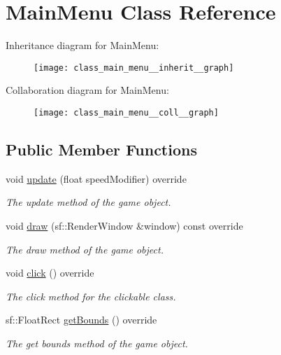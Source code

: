 \hypertarget{class_main_menu}{\section{Main\+Menu Class Reference}
\label{class_main_menu}
}


Inheritance diagram for Main\+Menu\+:\nopagebreak
\begin{figure}[H]
\begin{center}
\leavevmode
\texttt{[image: class\_main\_menu\_\_inherit\_\_graph]}
\end{center}
\end{figure}


Collaboration diagram for Main\+Menu\+:\nopagebreak
\begin{figure}[H]
\begin{center}
\leavevmode
\texttt{[image: class\_main\_menu\_\_coll\_\_graph]}
\end{center}
\end{figure}
\subsection*{Public Member Functions}
\begin{DoxyCompactItemize}
\item 
void \hyperlink{class_main_menu_a41b86746c468d18532123dfda01425de}{update} (float speed\+Modifier) override
\begin{DoxyCompactList}\small\item\em The update method of the game object. \end{DoxyCompactList}\item 
void \hyperlink{class_main_menu_a2956b42855e47b2e8e10412a26ef672b}{draw} (sf\+::\+Render\+Window \&window) const override
\begin{DoxyCompactList}\small\item\em The draw method of the game object. \end{DoxyCompactList}\item 
void \hyperlink{class_main_menu_ac97a553b913177aeabeb0bfcc4b54caa}{click} () override
\begin{DoxyCompactList}\small\item\em The click method for the clickable class. \end{DoxyCompactList}\item 
sf\+::\+Float\+Rect \hyperlink{class_main_menu_a6a52b7d7cb8e09360ebc3428aad67ed1}{get\+Bounds} () override
\begin{DoxyCompactList}\small\item\em The get bounds method of the game object. \end{DoxyCompactList}\end{DoxyCompactItemize}
